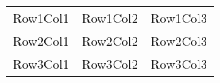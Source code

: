 \documentclass{article}
\begin{document}
\begin{tabular}{ccc}
\hline
Row1Col1 & Row1Col2 & Row1Col3 \\
Row2Col1 & Row2Col2 & Row2Col3 \\
Row3Col1 & Row3Col2 & Row3Col3 \\
\hline
\end{tabular}
\end{document}
